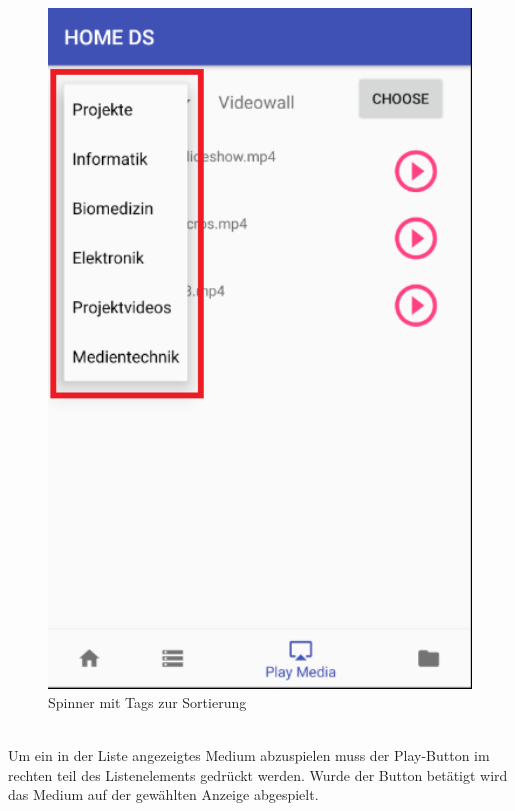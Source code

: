 \begin{figure}[H]
\centering
\includegraphics[width=1.0\textwidth]{images/06_AndroidApp/06_TagChoice}
\caption{Spinner mit Tags zur Sortierung}
\label{fig:mediaNav}
\end{figure}
\\
Um ein in der Liste angezeigtes Medium abzuspielen muss der Play-Button im rechten teil des Listenelements gedrückt werden. Wurde der Button betätigt wird das Medium auf der gewählten Anzeige abgespielt.
